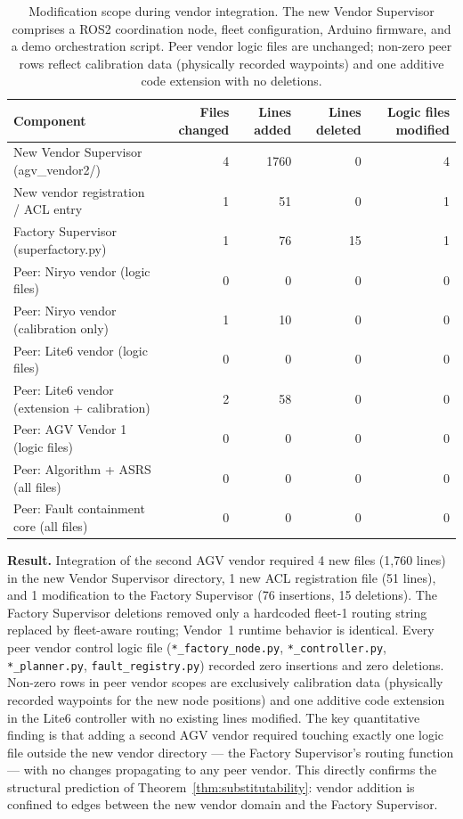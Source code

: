 \documentclass[a4paper,fleqn]{cas-dc}
\begin{document}
\begin{table}[h]
\centering
\caption{Modification scope during vendor integration. The new Vendor Supervisor comprises a ROS2 coordination node, fleet configuration, Arduino firmware, and a demo orchestration script. Peer vendor logic files are unchanged; non-zero peer rows reflect calibration data (physically recorded waypoints) and one additive code extension with no deletions.}
\label{tab:substitutability}
\begin{tabular}{lrrrr}
\toprule
\textbf{Component} & \textbf{Files changed} & \textbf{Lines added} & \textbf{Lines deleted} & \textbf{Logic files modified} \\
\midrule
New Vendor Supervisor (agv\_vendor2/)            & 4  & 1760 & 0  & 4 \\
New vendor registration / ACL entry             & 1  & 51   & 0  & 1 \\
Factory Supervisor (superfactory.py)             & 1  & 76   & 15 & 1 \\
Peer: Niryo vendor (logic files)                & 0  & 0    & 0  & 0 \\
Peer: Niryo vendor (calibration only)           & 1  & 10   & 0  & 0 \\
Peer: Lite6 vendor (logic files)                & 0  & 0    & 0  & 0 \\
Peer: Lite6 vendor (extension + calibration)    & 2  & 58   & 0  & 0 \\
Peer: AGV Vendor 1 (logic files)                & 0  & 0    & 0  & 0 \\
Peer: Algorithm + ASRS (all files)              & 0  & 0    & 0  & 0 \\
Peer: Fault containment core (all files)        & 0  & 0    & 0  & 0 \\
\bottomrule
\end{tabular}
\end{table}

\textbf{Result.} Integration of the second AGV vendor required 4 new files (1,760 lines) in the new Vendor Supervisor directory, 1 new ACL registration file (51 lines), and 1 modification to the Factory Supervisor (76 insertions, 15 deletions). The Factory Supervisor deletions removed only a hardcoded fleet-1 routing string replaced by fleet-aware routing; Vendor~1 runtime behavior is identical. Every peer vendor control logic file (\texttt{*\_factory\_node.py}, \texttt{*\_controller.py}, \texttt{*\_planner.py}, \texttt{fault\_registry.py}) recorded zero insertions and zero deletions. Non-zero rows in peer vendor scopes are exclusively calibration data (physically recorded waypoints for the new node positions) and one additive code extension in the Lite6 controller with no existing lines modified. The key quantitative finding is that adding a second AGV vendor required touching exactly one logic file outside the new vendor directory — the Factory Supervisor's routing function — with no changes propagating to any peer vendor. This directly confirms the structural prediction of Theorem~\ref{thm:substitutability}: vendor addition is confined to edges between the new vendor domain and the Factory Supervisor.
\end{document}
